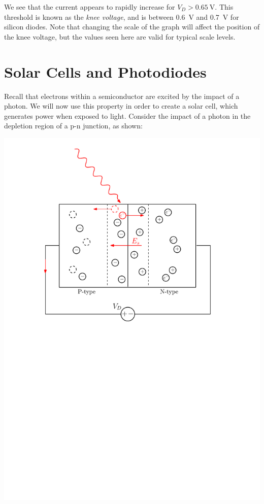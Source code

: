 \documentclass[letterpaper]{article}
\theoremstyle{remark}
\begin{document}
We see that the current appears to rapidly increase for $V_D > \SI{0.65}{\volt}$. This threshold is known as the \emph{knee voltage}, and is between \SI{0.6}{\volt} and \SI{0.7}{\volt} for silicon diodes. Note that changing the scale of the graph will affect the position of the knee voltage, but the values seen here are valid for typical scale levels.

\section{Solar Cells and Photodiodes}
Recall that electrons within a semiconductor are excited by the impact of a photon. We will now use this property in order to create a solar cell, which generates power when exposed to light. Consider the impact of a photon in the depletion region of a p-n junction, as shown:
\begin{center}
    \includegraphics[scale=0.7]{photodiode.pdf}
\end{center}
\end{document}
